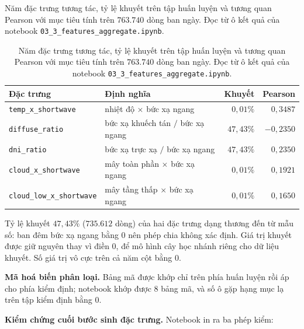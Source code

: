 \documentclass[12pt, a4paper]{report}
\begin{document}
\begin{table}[htbp]
\centering
\caption{Năm đặc trưng tương tác, tỷ lệ khuyết trên tập huấn luyện và tương quan Pearson với
mục tiêu tính trên $763.740$ dòng ban ngày. Đọc từ ô kết quả của notebook
\texttt{03\_3\_features\_aggregate.ipynb}.}
\label{tab:tuong_tac}
\small
\begin{tabular}{@{}L{5.0cm} L{4.6cm} r r@{}}
\toprule
\textbf{Đặc trưng} & \textbf{Định nghĩa} & \textbf{Khuyết} & \textbf{Pearson} \\
\midrule
\texttt{temp\_x\_shortwave} & nhiệt độ $\times$ bức xạ ngang & $0{,}01\%$ & $0{,}3487$ \\
\texttt{diffuse\_ratio} & bức xạ khuếch tán $/$ bức xạ ngang & $47{,}43\%$ & $-0{,}2350$ \\
\texttt{dni\_ratio} & bức xạ trực xạ $/$ bức xạ ngang & $47{,}43\%$ & $0{,}2350$ \\
\texttt{cloud\_x\_shortwave} & mây toàn phần $\times$ bức xạ ngang & $0{,}01\%$ & $0{,}1921$ \\
\texttt{cloud\_low\_x\_shortwave} & mây tầng thấp $\times$ bức xạ ngang & $0{,}01\%$ & $0{,}1650$ \\
\bottomrule
\end{tabular}
\caption[Năm đặc trưng tương tác, tỷ lệ khuyết trên tập huấn luyện và tương quan Pearson với mục tiêu]{Năm đặc trưng tương tác, tỷ lệ khuyết trên tập huấn luyện và tương quan Pearson với
mục tiêu tính trên $763.740$ dòng ban ngày. Đọc từ ô kết quả của notebook
\texttt{03\_3\_features\_aggregate.ipynb}.}
\label{tab:tuong_tac}
\end{table}

Tỷ lệ khuyết $47{,}43\%$ ($735.612$ dòng) của hai đặc trưng dạng thương đến từ mẫu số: ban
đêm bức xạ ngang bằng $0$ nên phép chia không xác định. Giá trị khuyết được giữ nguyên thay
vì điền $0$, để mô hình cây học nhánh riêng cho dữ liệu khuyết. Số giá trị vô cực trên cả
năm cột bằng $0$.

\textbf{Mã hoá biến phân loại.} Bảng mã được khớp chỉ trên phía huấn luyện rồi áp
cho phía kiểm định; notebook khớp được $8$ bảng mã, và số ô gặp hạng mục lạ trên tập kiểm
định bằng $0$.

\textbf{Kiểm chứng cuối bước sinh đặc trưng.} Notebook in ra ba phép kiểm:
\end{document}
